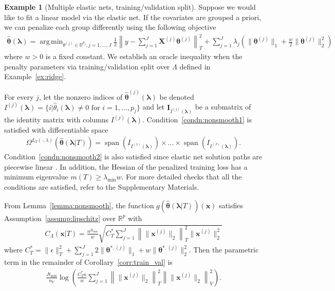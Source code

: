\documentclass[12pt]{article} %
\theoremstyle{definition}
\newtheorem{example}{Example}
\DeclareMathOperator{\spann}{span}
\DeclareMathOperator*{\argmin}{arg\,min}
\begin{document}
\begin{example}[Multiple elastic nets, training/validation split]
	\label{ex:elastic_net_tv}
	Suppose we would like to fit a linear model via the elastic net.
	If the covariates are grouped a priori, we can penalize each group differently using the following objective
	\begin{align}
	\hat{\boldsymbol{\theta}}(\boldsymbol{\lambda})
	=\argmin_{\theta^{(j)} \in \mathbb{R}^{p_j}, j = 1,...,J}
	\frac{1}{2} \left \| y - \sum_{j=1}^J \boldsymbol{X}^{(j)} \boldsymbol{\theta}^{(j)} \right \|_T^2
	+ \sum_{j=1}^J \lambda_j \left(
	\| \boldsymbol{\theta}^{(j)}\|_1
	+ \frac{w}{2} \| \boldsymbol{\theta}^{(j)}\|_2^2
	\right)
	\label{eq:elastic_net_ex}
	\end{align}
	where $w > 0$ is a fixed constant.
	We establish an oracle inequality when the penalty parameters via training/validation split over $\Lambda$ defined in Example~\ref{ex:ridge}.

	For every $j$, let the nonzero indices of $\hat{\boldsymbol{\theta}}^{(j)}(\boldsymbol{\lambda})$ be denoted $I^{(j)}(\boldsymbol\lambda) = \{i | \hat{\theta}_i(\boldsymbol\lambda) \ne 0 \text{ for } i=1,...,p_j \}$ and let $\boldsymbol I_{I^{(j)}(\boldsymbol \lambda)}$ be a submatrix of the identity matrix with columns $I^{(j)}(\boldsymbol\lambda)$.
	Condition~\ref{condn:nonsmooth1} is satisfied with differentiable space
	\begin{align}
	\Omega^{L_T(\cdot, \lambda)}(\hat{\boldsymbol{\theta}}(\boldsymbol{\lambda} | T))
	= \spann(I_{I^{(1)}(\boldsymbol \lambda)}) \times ... \times \spann(I_{I^{(J)}(\boldsymbol \lambda)}).
	\label{eq:en_diff_space}
	\end{align}
	Condition~\ref{condn:nonsmooth2} is also satisfied since elastic net solution paths are piecewise linear \citep{zou2003regression}.
	In addition, the Hessian of the penalized training loss has a minimum eigenvalue $m(T) \ge \lambda_{\min}w$.
	For more detailed checks that all the conditions are satisfied, refer to the Supplementary Materials.

	From Lemma~\ref{lemma:nonsmooth}, the function $g(\hat{\boldsymbol{\theta}}(\boldsymbol{\lambda} |T))(\boldsymbol{x})$ satisfies Assumption~\ref{assump:lipschitz} over $\mathbb{R}^p$ with
	\begin{align}
	C_\Lambda \left ( \boldsymbol{x} | T \right ) =
	\frac{n^{2t_{\min}}}{w}
	\sqrt{
	C^*_T
	\sum_{j = 1}^J
	\left \|
	\|\boldsymbol{x}^{(j)} \|_2
	\right \|_T^2
	\|\boldsymbol{x}^{(j)}\|_2^2
	}
	\label{eq:elastic_lipschitz}
	\end{align}
	where
	$
	C^*_T =
	\|\epsilon\|_{T}^{2}
	+\sum_{j=1}^J
	2 \|\boldsymbol{\theta}^{*,(j)}\|_1
	+ w\|\boldsymbol{\theta}^{*,(j)}\|_2^2
	$.
	Then the parametric term in the remainder of Corollary~\ref{corr:train_val} is
	\begin{align}
	\frac{J t_{\min}}{n_{V}}
	\log \left (
	\frac{C^*_T n}{w}
	\sum_{j=1}^J
	\left \| \|\boldsymbol{x}^{(j)}\|_2 \right \|_T^2 \left \| \|\boldsymbol{x}^{(j)}\|_2 \right \|_V^2
	\right ).
	\end{align}
\end{example}
\end{document}
